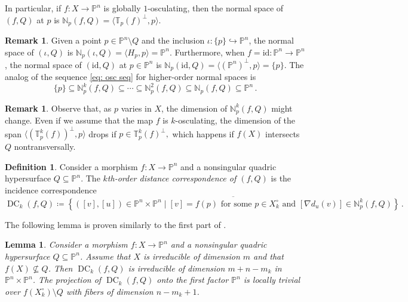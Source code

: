 \documentclass[11pt,reqno]{amsart}
\numberwithin{equation}{section}
\theoremstyle{plain}
\numberwithin{theorem}{section}
\newtheorem{lemma}[theorem]{Lemma}
\theoremstyle{definition}
\newtheorem{definition}[theorem]{Definition}
\newtheorem{remark}[theorem]{Remark}
\newcommand{\N}{\mathbb{N}}
\renewcommand{\P}{\mathbb{P}}
\newcommand{\T}{\mathbb{T}}
\newcommand{\DC}{\operatorname{DC}}
\begin{document}
In particular, if $f\colon X\to\P^n$ is globally $1$-osculating, then the normal space of $(f,Q)$ at $p$ is $\N_p(f,Q) = \langle\T_p(f)^\perp,p\rangle$.

\begin{remark}
Given a point $p\in\P^n\setminus Q$ and the inclusion $\iota\colon \{p\}\hookrightarrow\P^n$, the normal space of $(\iota,Q)$ is $\N_p(\iota,Q)=\langle H_p, p\rangle=\P^n$. Furthermore, when $f=\mathrm{id}\colon\P^n\to\P^n$, the normal space of $(\mathrm{id},Q)$ at $p\in\P^n$ is $\N_p(\mathrm{id},Q)=\langle(\P^n)^\perp,p\rangle=\{p\}.$ The analog of the sequence \eqref{eq: osc seq} for higher-order normal spaces is
\[
\{p\}\subseteq \N_p^k(f,Q) \subseteq \cdots \subseteq \N_p^2(f,Q)\subseteq \N_p(f,Q) \subseteq \P^n\,.
\]
\end{remark}

\begin{remark}
Observe that, as $p$ varies in $X$, the dimension of $\N_p^k(f,Q)$ might change. 
Even if we assume that the map $f$ is $k$-osculating, the dimension of the span $\langle(\T_p^k(f))^\perp,p\rangle$ drops if $p\in \T_p^k(f)^\perp,$ which happens if $f(X)$ intersects $Q$ nontransversally.
\end{remark}

\begin{definition}{\cite[p. 245]{piene2022higher}}\label{def: kth distance correspondence}
Consider a morphism $f\colon X\to\P^n$ and a nonsingular quadric hypersurface $Q\subseteq\P^n$. The {\em $k$th-order distance correspondence of $(f,Q)$} is the incidence correspondence
\[
\DC_k(f,Q) \coloneqq \overline{\left\{([v],[u])\in\P^n\times\P^n \mid \text{$[v]=f(p)$ for some $p\in X_k^{\circ}$ and $[\nabla d_{u}(v)]\in \N_p^k(f,Q)$}\right\}}\,.
\]
\end{definition}

The following lemma is proven similarly to the first part of \cite[Theorem 4.1]{DHOST}.

\begin{lemma}\label{lem: higher-order proj ED correspondence is irreducible}
Consider a morphism $f\colon X\to\P^n$ and a nonsingular quadric hypersurface $Q\subseteq\P^n$. Assume that $X$ is irreducible of dimension $m$ and that $f(X)\not\subseteq Q$. Then $\DC_k(f,Q)$ is irreducible of dimension $m+n-m_k$ in $\P^n\times\P^n$. The projection of $\DC_k(f,Q)$ onto the first factor $\P^n$ is locally trivial over $f(X_k^{\circ})\setminus Q$ with fibers of dimension $n-m_k+1$.
\end{lemma}
\end{document}
